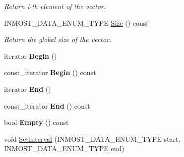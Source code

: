 \begin{DoxyCompactItemize}
\begin{DoxyCompactList}\small\item\em Return i-\/th element of the vector. \end{DoxyCompactList}\item 
\hypertarget{classINMOST_1_1Solver_1_1Vector_aea1579d114af959dff27bd69c8f40a07}{I\-N\-M\-O\-S\-T\-\_\-\-D\-A\-T\-A\-\_\-\-E\-N\-U\-M\-\_\-\-T\-Y\-P\-E \hyperlink{classINMOST_1_1Solver_1_1Vector_aea1579d114af959dff27bd69c8f40a07}{Size} () const }\label{classINMOST_1_1Solver_1_1Vector_aea1579d114af959dff27bd69c8f40a07}

\begin{DoxyCompactList}\small\item\em Return the global size of the vector. \end{DoxyCompactList}\item 
\hypertarget{classINMOST_1_1Solver_1_1Vector_ac829a74b1d627b7426ad9ca0d43e83d5}{iterator {\bfseries Begin} ()}\label{classINMOST_1_1Solver_1_1Vector_ac829a74b1d627b7426ad9ca0d43e83d5}

\item 
\hypertarget{classINMOST_1_1Solver_1_1Vector_a6022f0010e576450716bce400d8c48a2}{const\-\_\-iterator {\bfseries Begin} () const }\label{classINMOST_1_1Solver_1_1Vector_a6022f0010e576450716bce400d8c48a2}

\item 
\hypertarget{classINMOST_1_1Solver_1_1Vector_a68cbf5f6a522ebf28d0bcbf30b7e2e90}{iterator {\bfseries End} ()}\label{classINMOST_1_1Solver_1_1Vector_a68cbf5f6a522ebf28d0bcbf30b7e2e90}

\item 
\hypertarget{classINMOST_1_1Solver_1_1Vector_afcd74adf7f54914bc97a8d57763082a1}{const\-\_\-iterator {\bfseries End} () const }\label{classINMOST_1_1Solver_1_1Vector_afcd74adf7f54914bc97a8d57763082a1}

\item 
\hypertarget{classINMOST_1_1Solver_1_1Vector_a5abe1ebf163e8bf90d4005ae886e002a}{bool {\bfseries Empty} () const }\label{classINMOST_1_1Solver_1_1Vector_a5abe1ebf163e8bf90d4005ae886e002a}

\item 
\hypertarget{classINMOST_1_1Solver_1_1Vector_afb75bff310879ce66cde5c53dede732e}{void \hyperlink{classINMOST_1_1Solver_1_1Vector_afb75bff310879ce66cde5c53dede732e}{Set\-Interval} (I\-N\-M\-O\-S\-T\-\_\-\-D\-A\-T\-A\-\_\-\-E\-N\-U\-M\-\_\-\-T\-Y\-P\-E start, I\-N\-M\-O\-S\-T\-\_\-\-D\-A\-T\-A\-\_\-\-E\-N\-U\-M\-\_\-\-T\-Y\-P\-E end)}\label{classINMOST_1_1Solver_1_1Vector_afb75bff310879ce66cde5c53dede732e}


\end{DoxyCompactItemize}
